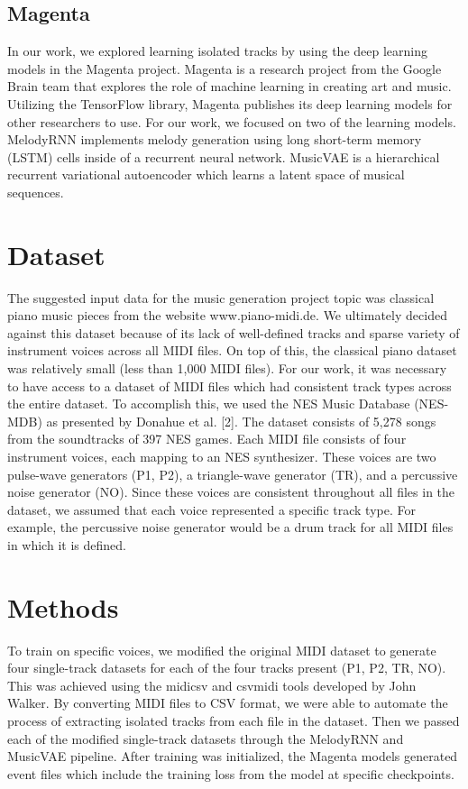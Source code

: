 \documentclass{article}
\begin{document}
\subsection{Magenta}

In our work, we explored learning isolated tracks by using the deep learning models in the Magenta project. Magenta is a research project from the Google Brain team that explores the role of machine learning in creating art and music. Utilizing the TensorFlow library, Magenta publishes its deep learning models for other researchers to use. For our work, we focused on two of the learning models. MelodyRNN implements melody generation using long short-term memory (LSTM) cells inside of a recurrent neural network. MusicVAE is a hierarchical recurrent variational autoencoder which learns a latent space of musical sequences.


\section{Dataset}

The suggested input data for the music generation project topic was classical piano music pieces from the website www.piano-midi.de. We ultimately decided against this dataset because of its lack of well-defined tracks and sparse variety of instrument voices across all MIDI files. On top of this, the classical piano dataset was relatively small (less than 1,000 MIDI files). For our work, it was necessary to have access to a dataset of MIDI files which had consistent track types across the entire dataset. To accomplish this, we used the NES Music Database (NES-MDB) as presented by Donahue et al. [2]. The dataset consists of 5,278 songs from the soundtracks of 397 NES games. Each MIDI file consists of four instrument voices, each mapping to an NES synthesizer. These voices are two pulse-wave generators (P1, P2), a triangle-wave generator (TR), and a percussive noise generator (NO). Since these voices are consistent throughout all files in the dataset, we assumed that each voice represented a specific track type. For example, the percussive noise generator would be a drum track for all MIDI files in which it is defined.


\section{Methods}

To train on specific voices, we modified the original MIDI dataset to generate four single-track datasets for each of the four tracks present (P1, P2, TR, NO). This was achieved using the midicsv and csvmidi tools developed by John Walker. By converting MIDI files to CSV format, we were able to automate the process of extracting isolated tracks from each file in the dataset. Then we passed each of the modified single-track datasets through the MelodyRNN and MusicVAE pipeline. After training was initialized, the Magenta models generated event files which include the training loss from the model at specific checkpoints.
\end{document}
